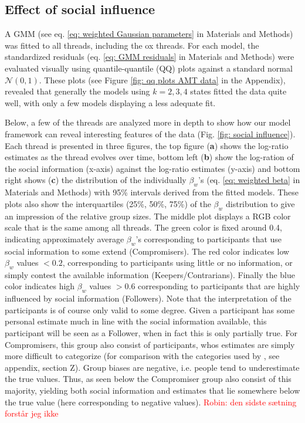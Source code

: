 \documentclass[9pt,twocolumn,twoside,lineno]{pnas-new}
\begin{document}
\subsection*{Effect of social influence}
A GMM (see eq. \ref{eq: weighted Gaussian parameters} in Materials and Methods) was fitted to all threads, including the ox threads. For each model, the standardized residuals (eq. \ref{eq: GMM residuals} in Materials and Methods) were evaluated visually using quantile-quantile (QQ) plots against a standard normal $\mathcal{N}(0,1)$. These plots (see Figure \ref{fig: qq plots AMT data} in the Appendix), revealed that generally the models using $k=2,3,4$ states fitted the data quite well, with only a few models displaying a less adequate fit. 

Below, a few of the threads are analyzed more in depth to show how our model framework can reveal interesting features of the data (Fig. \ref{fig: social influence}). Each thread is presented in three figures, the top figure (\textbf{a}) shows the log-ratio estimates as the thread evolves over time, bottom left (\textbf{b}) show the log-ration of the social information (x-axis) against the log-ratio estimates (y-axis) and bottom right shows (\textbf{c}) the distribution of the individually $\beta_w$'s (eq. \ref{eq: weighted beta} in Materials and Methods) with 95\% intervals derived from the fitted models. These plots also show the interquartiles (25\%, 50\%, 75\%) of the $\beta_w$ distribution to give an impression of the relative group sizes. The middle plot displays a RGB color scale that is the same among all threads. The green color is fixed around 0.4, indicating approximately average $\beta_w$'s  corresponding to participants that use social information to some extend (Compromisers). The red color indicates low $\beta_w$ values $<0.2$, corresponding to participants using little or no information, or simply contest the available information (Keepers/Contrarians). Finally the blue color indicates high $\beta_w$ values $>0.6$ corresponding to participants that are highly influenced by social information (Followers). Note that the interpretation of the participants is of course only valid to some degree. Given a participant has some personal estimate much in line with the social information available, this participant will be seen as a Follower, when in fact this is only partially true. For Compromisers, this group also consist of participants, whos estimates are simply more difficult to categorize (for comparison with the categories used by \citet{jayles2017social}, see appendix, section Z). Group biases are negative, i.e. people tend to underestimate the true values. Thus, as seen below the Compromiser group also consist of this majority, yielding both social information and estimates that lie somewhere below the true value (here corresponding to negative values). \textcolor{red}{Robin: den sidste sætning forstår jeg ikke} 
\end{document}
